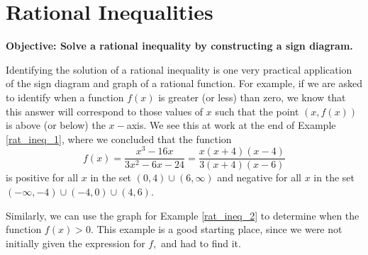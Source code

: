 \documentclass[12pt]{book}
\theoremstyle{definition}
\begin{document}
\section{Rational Inequalities %
}
{\bf Objective: Solve a rational inequality by constructing a sign diagram.}\par
Identifying the solution of a rational inequality is one very practical application of the sign diagram and graph of a rational function.  For example, if we are asked to identify when a function $f(x)$ is greater (or less) than zero, we know that this answer will correspond to those values of $x$ such that the point $(x,f(x))$ is above (or below) the $x-$axis.  We see this at work at the end of Example \ref{rat_ineq_1}, where we concluded that the function $$f(x)=\dfrac{x^3-16x}{3x^2-6x-24}=\dfrac{x(x+4)(x-4)}{3(x+4)(x-6)}$$ is positive for all $x$ in the set $(0,4)\cup(6,\infty)$ and negative for all $x$ in the set $(-\infty,-4)\cup(-4,0)\cup(4,6)$.
\par
Similarly, we can use the graph for Example \ref{rat_ineq_2} to determine when the function $f(x)>0$.  This example is a good starting place, since we were not initially given the expression for $f,$ and had to find it.
\end{document}
